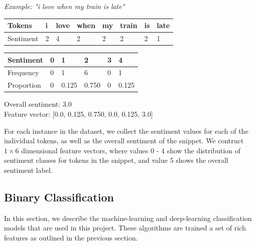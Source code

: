 \documentclass[12pt,a4paper]{article}
\begin{document}
\hspace{-15pt}\begin{minipage}{0.55\textwidth}
	\textit{Example: "i love when my train is late"}\vspace{-15pt}
	\begin{center}	
		\begin{tabular}{|m{1.8cm}||m{0.4cm}m{0.6cm}m{0.75cm}m{0.4cm}m{0.7cm}m{0.2cm}m{0.6cm}|}
			\hline 
			\textbf{Tokens} & \textbf{i} & \textbf{love} & \textbf{when} & \textbf{my} & \textbf{train} & \textbf{is} & \textbf{late}\\ 
			\hline 
			Sentiment & 2 & 4 & 2 & 2 & 2 & 2 & 1\\ 
			\hline 
		\end{tabular}
		\vspace{5pt}
		
		\begin{tabular}{|p{1.8cm}||p{0.9cm}|p{0.9cm}|p{0.9cm}|p{0.9cm}|p{0.9cm}|} 
			\hline 
			\textbf{Sentiment} & \textbf{0} & \textbf{1} & \textbf{2} & \textbf{3} & \textbf{4}\\ 
			\hline 
			Frequency & 0 & 1 & 6 & 0 & 1\\ 
			Proportion & 0 & 0.125 & 0.750 & 0 & 0.125\\
			\hline  
		\end{tabular}
	\end{center}
	Overall sentiment: 3.0\\
	Feature vector: [0.0, 0.125, 0.750, 0.0, 0.125, 3.0]\\
\end{minipage}
\hspace{15pt}\begin{minipage}{0.4\textwidth}
	\vspace{-5pt}
	For each instance in the dataset, we collect the sentiment values for each of the individual tokens, as well as the overall sentiment of the snippet. We contruct $ 1 \times 6 $ dimensional feature vectors, where values 0 - 4 show the distribution of sentiment classes for tokens in the snippet, and value 5 shows the overall sentiment label.\\
\end{minipage}



\subsection{Binary Classification}
\noindent 
In this section, we describe the machine-learning and deep-learning classification models that are used in this project. These algorithms are trained a set of rich features as outlined in the previous section.\vspace{-3pt}
\end{document}
